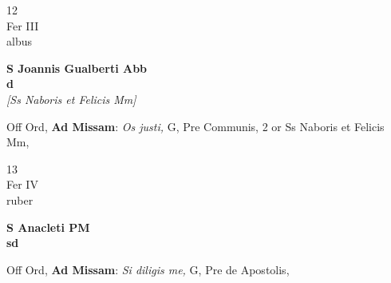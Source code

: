 \documentclass[10pt, openany]{book}
\begin{document}
        \begin{center}
            \begin{minipage}{3.5in}
                \vspace{2em}
                \begin{minipage}{0.5in}
                    {\Huge 12} \\
                    {\normalsize Fer III} \\
                    {\normalsize albus}
                \end{minipage}
                \begin{minipage}{3.0in}
                    \textbf{ \large S Joannis Gualberti Abb \\
                    \textnormal{\normalsize d}} \\ \textit{[Ss Naboris et Felicis Mm]} \\ 
                \end{minipage}
                \begin{justify}Off Ord, \textbf{Ad Missam}: \textit{Os justi,} G, Pre Communis, 2 or Ss Naboris et Felicis Mm,  
                \end{justify}
            \end{minipage}
        \end{center}
    
        \begin{center}
            \begin{minipage}{3.5in}
                \vspace{2em}
                \begin{minipage}{0.5in}
                    {\Huge 13} \\
                    {\normalsize Fer IV} \\
                    {\normalsize ruber}
                \end{minipage}
                \begin{minipage}{3.0in}
                    \textbf{ \large S Anacleti PM \\
                    \textnormal{\normalsize sd}} \\ 
                \end{minipage}
                \begin{justify}Off Ord, \textbf{Ad Missam}: \textit{Si diligis me,} G, Pre de Apostolis,  
                \end{justify}
            \end{minipage}
        \end{center}
    
\end{document}
